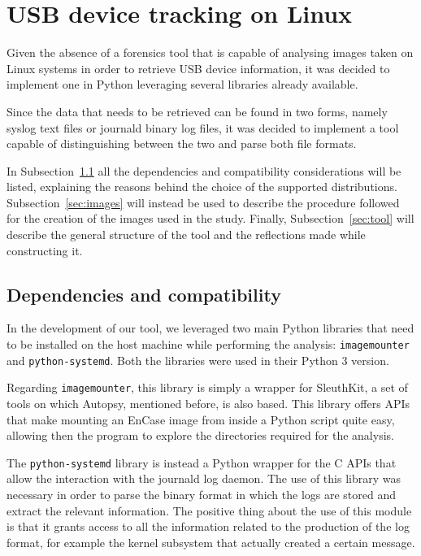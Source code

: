\documentclass[a4paper]{article}
\begin{document}
\section{USB device tracking on Linux}
\label{sec:contrib}
Given the absence of a forensics tool that is capable of analysing images taken
on Linux systems in order to retrieve USB device information, it was decided to
implement one in Python leveraging several libraries already available.

Since the data that needs to be retrieved can be found in two forms, namely
syslog text files or journald binary log files, it was decided to implement a
tool capable of distinguishing between the two and parse both file formats.

In Subsection~\ref{sec:prems} all the dependencies and compatibility
considerations will be listed, explaining the reasons behind the choice of the
supported distributions. Subsection~\ref{sec:images} will instead be used to
describe the procedure followed for the creation of the images used in the
study. Finally, Subsection~\ref{sec:tool} will describe the general structure of
the tool and the reflections made while constructing it.

\subsection{Dependencies and compatibility}
\label{sec:prems}
In the development of our tool, we leveraged two main Python libraries that need
to be installed on the host machine while performing the analysis:
\texttt{imagemounter} and \texttt{python-systemd}. Both the libraries were used
in their Python 3 version.

Regarding \texttt{imagemounter}, this library is simply a wrapper for
SleuthKit, a set of tools on which Autopsy, mentioned before, is also based.
This library offers APIs that make mounting an EnCase image from inside a Python
script quite easy, allowing then the program to explore the directories required
for the analysis.

The \texttt{python-systemd} library is instead a Python wrapper for the C APIs
that allow the interaction with the journald log daemon. The use of this library
was necessary in order to parse the binary format in which the logs are stored
and extract the relevant information. The positive thing about the use of this
module is that it grants access to all the information related to the production
of the log format, for example the kernel subsystem that actually created a
certain message.
\end{document}
